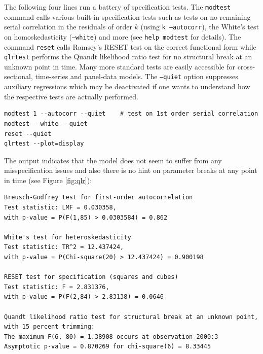 \documentclass[11pt]{article}
\begin{document}
The following four lines run a battery of specification tests. The \texttt{modtest} command calls various built-in specification tests such as tests on no remaining serial correlation in the residuals of order $ k $ (using \texttt{k ---autocorr}), the White's test on homoskedasticity (\texttt{---white}) and more (see \texttt{help modtest} for details). The command \texttt{reset} calls Ramsey's RESET test on the correct functional form while \texttt{qlrtest} performs the Quandt likelihood ratio test for no structural break at an unknown point in time. Many more standard tests are easily accessible for cross-sectional, time-series and panel-data models. The \texttt{---quiet} option suppresses auxiliary regressions which may be deactivated if one wants to understand how the respective tests are actually performed.

\begin{Verbatim}[baselinestretch=0.75, fontsize=\small]
modtest 1 --autocorr --quiet	# test on 1st order serial correlation
modtest --white --quiet
reset --quiet
qlrtest --plot=display
\end{Verbatim}

The output indicates that the model does not seem to suffer from any misspecification issues and also there is no hint on parameter breaks at any point in time (see Figure \ref{fig:qlr}):

\begin{Verbatim}[baselinestretch=0.75, fontsize=\small]
Breusch-Godfrey test for first-order autocorrelation
Test statistic: LMF = 0.030358,
with p-value = P(F(1,85) > 0.0303584) = 0.862

White's test for heteroskedasticity
Test statistic: TR^2 = 12.437424,
with p-value = P(Chi-square(20) > 12.437424) = 0.900198

RESET test for specification (squares and cubes)
Test statistic: F = 2.831376,
with p-value = P(F(2,84) > 2.83138) = 0.0646

Quandt likelihood ratio test for structural break at an unknown point,
with 15 percent trimming:
The maximum F(6, 80) = 1.38908 occurs at observation 2000:3
Asymptotic p-value = 0.870269 for chi-square(6) = 8.33445
\end{Verbatim}
\end{document}
